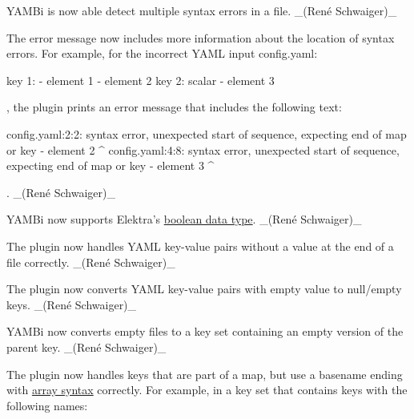 \begin{DoxyItemize}
\item Y\+A\+M\+Bi is now able detect multiple syntax errors in a file. \+\_\+(René Schwaiger)\+\_\+
\item The error message now includes more information about the location of syntax errors. For example, for the incorrect Y\+A\+ML input {\ttfamily config.\+yaml}\+:
\end{DoxyItemize}


\begin{DoxyCode}
key 1: - element 1
 - element 2
key 2: scalar
       - element 3
\end{DoxyCode}


, the plugin prints an error message that includes the following text\+:


\begin{DoxyCode}
config.yaml:2:2: syntax error, unexpected start of sequence, expecting end of map or key
                  - element 2
                  ^
config.yaml:4:8: syntax error, unexpected start of sequence, expecting end of map or key
                        - element 3
                        ^
\end{DoxyCode}


. \+\_\+(René Schwaiger)\+\_\+


\begin{DoxyItemize}
\item Y\+A\+M\+Bi now supports Elektra’s \hyperlink{doc_decisions_boolean_md}{boolean data type}. \+\_\+(René Schwaiger)\+\_\+
\item The plugin now handles Y\+A\+ML key-\/value pairs without a value at the end of a file correctly. \+\_\+(René Schwaiger)\+\_\+
\item The plugin now converts Y\+A\+ML key-\/value pairs with empty value to null/empty keys. \+\_\+(René Schwaiger)\+\_\+
\item Y\+A\+M\+Bi now converts empty files to a key set containing an empty version of the parent key. \+\_\+(René Schwaiger)\+\_\+
\end{DoxyItemize}


\begin{DoxyItemize}
\item The plugin now handles keys that are part of a map, but use a basename ending with \hyperlink{doc_tutorials_arrays_md}{array syntax} correctly. For example, in a key set that contains keys with the following names\+:
\end{DoxyItemize}


